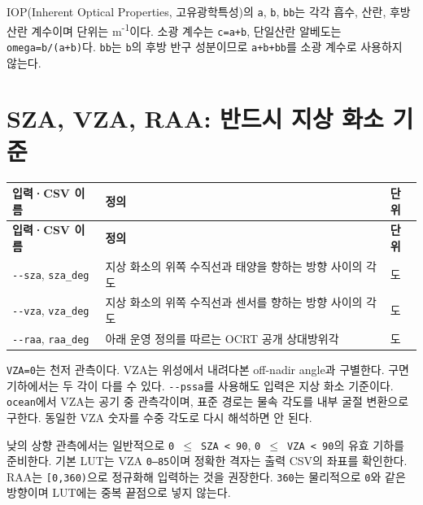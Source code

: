 IOP(Inherent Optical Properties, 고유광학특성)의 \texttt{a}, \texttt{b}, \texttt{bb}는 각각 흡수, 산란, 후방산란 계수이며 단위는 m\textsuperscript{-}\textsuperscript{1}이다. 소광 계수는 \texttt{c=\allowbreak{}a+b}, 단일산란 알베도는 \texttt{omega=\allowbreak{}b/\allowbreak{}(a+b)}다. \texttt{bb}는 \texttt{b}의 후방 반구 성분이므로 \texttt{a+b+bb}를 소광 계수로 사용하지 않는다.

\section{SZA, VZA, RAA: 반드시 지상 화소 기준}
\label{sec:auto:01_concepts_geometry:3}

{\TableFont
\begin{longtable}{@{}>{\raggedright\arraybackslash}p{}>{\raggedright\arraybackslash}p{}>{\raggedright\arraybackslash}p{}@{}}
\toprule
\textbf{입력·CSV 이름} & \textbf{정의} & \textbf{단위} \\
\midrule
\endfirsthead
\toprule
\textbf{입력·CSV 이름} & \textbf{정의} & \textbf{단위} \\
\midrule
\endhead
\bottomrule
\endfoot
\texttt{-\allowbreak{}-\allowbreak{}sza}, \texttt{sza\_\allowbreak{}deg} & 지상 화소의 위쪽 수직선과 태양을 향하는 방향 사이의 각도 & 도 \\
\texttt{-\allowbreak{}-\allowbreak{}vza}, \texttt{vza\_\allowbreak{}deg} & 지상 화소의 위쪽 수직선과 센서를 향하는 방향 사이의 각도 & 도 \\
\texttt{-\allowbreak{}-\allowbreak{}raa}, \texttt{raa\_\allowbreak{}deg} & 아래 운영 정의를 따르는 OCRT 공개 상대방위각 & 도 \\
\end{longtable}
}

\texttt{VZA=\allowbreak{}0\textdegree{}}는 천저 관측이다. VZA는 위성에서 내려다본 off-nadir angle과 구별한다. 구면 기하에서는 두 각이 다를 수 있다. \texttt{-\allowbreak{}-\allowbreak{}pssa}를 사용해도 입력은 지상 화소 기준이다. \texttt{ocean}에서 VZA는 공기 중 관측각이며, 표준 경로는 물속 각도를 내부 굴절 변환으로 구한다. 동일한 VZA 숫자를 수중 각도로 다시 해석하면 안 된다.

낮의 상향 관측에서는 일반적으로 \texttt{0 \ensuremath{\leq} SZA < 90}, \texttt{0 \ensuremath{\leq} VZA < 90}의 유효 기하를 준비한다. 기본 LUT는 VZA \texttt{0--85\textdegree{}}이며 정확한 격자는 출력 CSV의 좌표를 확인한다. RAA는 \texttt{[0,\allowbreak{}360)}으로 정규화해 입력하는 것을 권장한다. \texttt{360\textdegree{}}는 물리적으로 \texttt{0\textdegree{}}와 같은 방향이며 LUT에는 중복 끝점으로 넣지 않는다.

